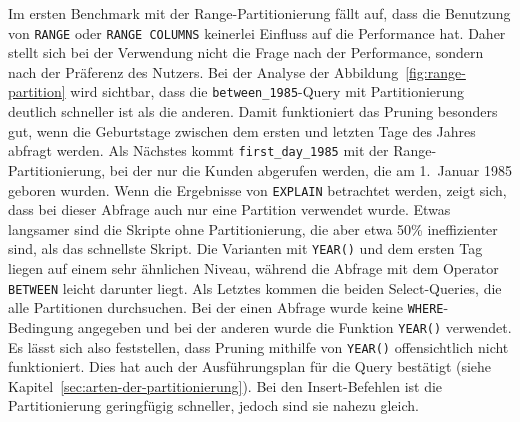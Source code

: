 Im ersten Benchmark mit der Range-Partitionierung fällt auf, dass die Benutzung von \texttt{RANGE} oder \texttt{RANGE COLUMNS} keinerlei Einfluss auf die Performance hat.
Daher stellt sich bei der Verwendung nicht die Frage nach der Performance, sondern nach der Präferenz des Nutzers.
Bei der Analyse der Abbildung~\ref{fig:range-partition} wird sichtbar, dass die \texttt{between\_1985}-Query mit Partitionierung deutlich schneller ist als die anderen.
Damit funktioniert das Pruning besonders gut, wenn die Geburtstage zwischen dem ersten und letzten Tage des Jahres abfragt werden.
Als Nächstes kommt \texttt{first\_day\_1985} mit der Range-Partitionierung, bei der nur die Kunden abgerufen werden, die am 1.\ Januar 1985 geboren wurden.
Wenn die Ergebnisse von \texttt{EXPLAIN} betrachtet werden, zeigt sich, dass bei dieser Abfrage auch nur eine Partition verwendet wurde.
Etwas langsamer sind die Skripte ohne Partitionierung, die aber etwa 50\% ineffizienter sind, als das schnellste Skript.
Die Varianten mit \texttt{YEAR()} und dem ersten Tag liegen auf einem sehr ähnlichen Niveau, während die Abfrage mit dem Operator \texttt{BETWEEN} leicht darunter liegt.
Als Letztes kommen die beiden Select-Queries, die alle Partitionen durchsuchen.
Bei der einen Abfrage wurde keine \texttt{WHERE}-Bedingung angegeben und bei der anderen wurde die Funktion \texttt{YEAR()} verwendet.
Es lässt sich also feststellen, dass Pruning mithilfe von \texttt{YEAR()} offensichtlich nicht funktioniert.
Dies hat auch der Ausführungsplan für die Query bestätigt (siehe Kapitel~\ref{sec:arten-der-partitionierung}).
Bei den Insert-Befehlen ist die Partitionierung geringfügig schneller, jedoch sind sie nahezu gleich.

